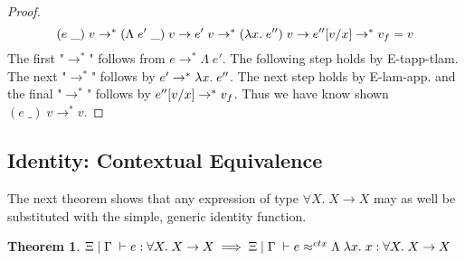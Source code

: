 \documentclass[twoside,11pt,openright]{report}
\newtheorem{theorem}{Theorem}
\theoremstyle{definition}
\newcommand{\var}{x}
\newcommand{\expr}{e}
\newcommand{\val}{v}
\newcommand{\Tvar}{X}
\newcommand{\Tlam}{\Lambda\;}
\newcommand{\Tapp}[1]{#1\;\_}
\newcommand{\subst}[3]{#1{\left[#3 \middle/ #2 \right]}}
\newcommand{\Tfunc}[2]{#1 \rightarrow #2}
\newcommand{\Tall}[2]{\forall #1.\; #2}
\newcommand{\venv}{\Gamma}
\newcommand{\tenv}{\Xi}
\newcommand{\jdg}[4]{#1 \; | \; #2 \; \vdash #3 : #4}
\newcommand{\jdgRel}[6]{#1 \; | \; #2 \; \vdash #3 \approx^{#4} #5 : #6}
\newcommand{\ctxRel}[5]{\jdgRel{#1}{#2}{#3}{ctx}{#4}{#5}}
\newcommand{\step}{\rightarrow}
\newcommand{\stepS}{\rightarrow^*}
\begin{document}
\begin{proof}
  \begin{equation}
    (\Tapp{\expr}) \; \val \stepS (\Tapp{\Tlam \expr'}) \; \val \step \expr' \; \val \stepS (\fun \var . \expr'') \; \val \step \subst{\expr''}{\var}{\val} \stepS \val_f = \val
  \end{equation}
  The first "$\stepS$" follows from $\expr \stepS \Tlam \expr'$. The following step holds by E-tapp-tlam. The next "$\stepS$" follows by $\expr' \stepS \fun \var . \expr''$. The next step holds by E-lam-app. and the final "$\stepS$" follows by $\subst{\expr''}{\var}{\val} \stepS \val_f$. Thus we have know shown $(\Tapp{\expr}) \; \val \stepS \val$.
\end{proof}

\subsection{Identity: Contextual Equivalence}
The next theorem shows that any expression of type $\Tall{\Tvar}{\Tfunc{\Tvar}{\Tvar}}$ may as well be substituted with the simple, generic identity function.
\begin{theorem}
  $\jdg{\tenv}{\venv}{\expr}{\Tall{\Tvar}{\Tfunc{\Tvar}{\Tvar}}} \implies \ctxRel{\tenv}{\venv}{\expr}{\Tlam \fun \var . \var}{\Tall{\Tvar}{\Tfunc{\Tvar}{\Tvar}}}$
\end{theorem}
\end{document}
